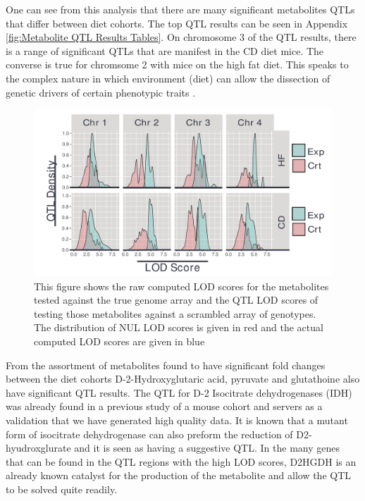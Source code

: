 \documentclass[a4paper,11pt,twoside]{book}
\begin{document}
	One can see from this analysis that there are many significant metabolites QTLs that differ between diet cohorts. The top QTL results can be seen in Appendix \ref{fig:Metabolite QTL Results Tables}. On chromosome 3 of the QTL results, there is a range of significant QTLs that are manifest in the CD diet mice. The converse is true for chromsome 2 with mice on the high fat diet. This speaks to the complex nature in which environment (diet) can allow the dissection of genetic drivers of certain phenotypic traits \citep{Abiola2003identification}.
	
	\begin{figure}
		\includegraphics[width=1.2\linewidth]{QTL_Results/QTL_Densities.pdf}
		\caption{This figure shows the raw computed LOD scores for the metabolites tested against the true genome array and the QTL LOD scores of testing those metabolites against a scrambled array of genotypes. The distribution of NUL LOD scores is given in red and the actual computed LOD scores are given in blue }
	\label{fig: Distributions of QTL LOD scores for all significant Age and Diet related Metabolites}	
\end{figure}
	
	From the assortment of metabolites found to have significant fold changes between the diet cohorts D-2-Hydroxyglutaric acid, pyruvate and glutathoine also have significant QTL results. The QTL for D-2 Isocitrate dehydrogenases (IDH) was already found in a previous study of a mouse cohort and servers as a validation that we have generated high quality data.  It is known that a mutant form of isocitrate dehydrogenase can also preform the reduction of D2-hyudroxglurate and it is seen as having a suggestive QTL. In the many genes that can be found in the QTL regions with the high LOD scores, D2HGDH is an already known catalyst for the production of the metabolite and allow the QTL to be solved quite readily.
	
\end{document}

